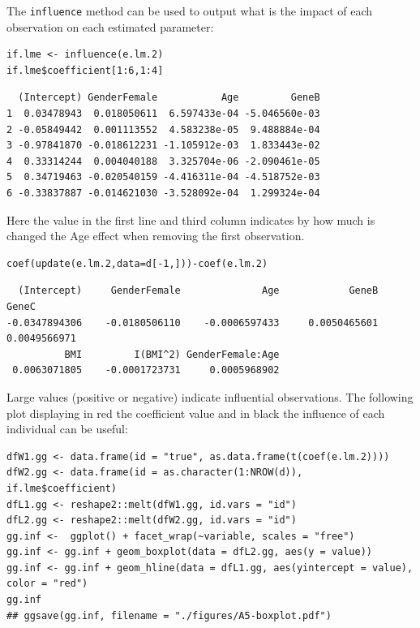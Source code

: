 \documentclass[12pt]{article}
\begin{document}
The \texttt{influence} method can be used to output what is the impact of
each observation on each estimated parameter:
\lstset{language=r,label= ,caption= ,captionpos=b,numbers=none}
\begin{lstlisting}
if.lme <- influence(e.lm.2)
if.lme$coefficient[1:6,1:4]
\end{lstlisting}

\begin{verbatim}
  (Intercept) GenderFemale           Age         GeneB
1  0.03478943  0.018050611  6.597433e-04 -5.046560e-03
2 -0.05849442  0.001113552  4.583238e-05  9.488884e-04
3 -0.97841870 -0.018612231 -1.105912e-03  1.833443e-02
4  0.33314244  0.004040188  3.325704e-06 -2.090461e-05
5  0.34719463 -0.020540159 -4.416311e-04 -4.518752e-03
6 -0.33837887 -0.014621030 -3.528092e-04  1.299324e-04
\end{verbatim}

Here the value in the first line and third column indicates by how
much is changed the Age effect when removing the first observation.
\lstset{language=r,label= ,caption= ,captionpos=b,numbers=none}
\begin{lstlisting}
coef(update(e.lm.2,data=d[-1,]))-coef(e.lm.2)
\end{lstlisting}

\begin{verbatim}
  (Intercept)     GenderFemale              Age            GeneB            GeneC 
-0.0347894306    -0.0180506110    -0.0006597433     0.0050465601     0.0049566971 
          BMI         I(BMI^2) GenderFemale:Age 
 0.0063071805    -0.0001723731     0.0005968902
\end{verbatim}

Large values (positive or negative) indicate influential
observations. The following plot displaying in red the coefficient
value and in black the influence of each individual can be useful:
\lstset{language=r,label= ,caption= ,captionpos=b,numbers=none}
\begin{lstlisting}
dfW1.gg <- data.frame(id = "true", as.data.frame(t(coef(e.lm.2))))
dfW2.gg <- data.frame(id = as.character(1:NROW(d)), if.lme$coefficient)
dfL1.gg <- reshape2::melt(dfW1.gg, id.vars = "id")
dfL2.gg <- reshape2::melt(dfW2.gg, id.vars = "id")
gg.inf <-  ggplot() + facet_wrap(~variable, scales = "free")
gg.inf <- gg.inf + geom_boxplot(data = dfL2.gg, aes(y = value))
gg.inf <- gg.inf + geom_hline(data = dfL1.gg, aes(yintercept = value), color = "red")
gg.inf
## ggsave(gg.inf, filename = "./figures/A5-boxplot.pdf")
\end{lstlisting}
\end{document}
